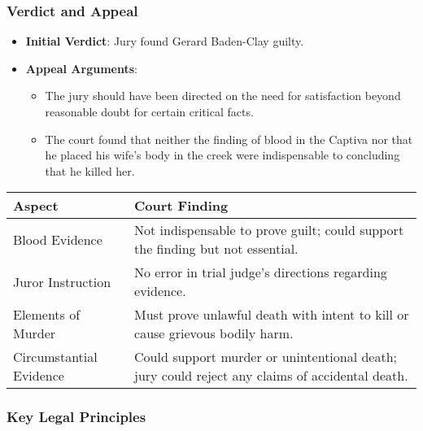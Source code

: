\subsubsection{Verdict and Appeal}\label{verdict-and-appeal}

\begin{itemize}
\tightlist
\item
  \textbf{Initial Verdict}: Jury found Gerard Baden-Clay guilty.
\item
  \textbf{Appeal Arguments}:

  \begin{itemize}
  \tightlist
  \item
    The jury should have been directed on the need for satisfaction
    beyond reasonable doubt for certain critical facts.
  \item
    The court found that neither the finding of blood in the Captiva nor
    that he placed his wife's body in the creek were indispensable to
    concluding that he killed her.
  \end{itemize}
\end{itemize}

\begin{longtable}[]{@{}
  >{\raggedright\arraybackslash}p{}
  >{\raggedright\arraybackslash}p{}@{}}
\toprule\noalign{}
\begin{minipage}[b]{\linewidth}\raggedright
Aspect
\end{minipage} & \begin{minipage}[b]{\linewidth}\raggedright
Court Finding
\end{minipage} \\
\midrule\noalign{}
\endhead
\bottomrule\noalign{}
\endlastfoot
Blood Evidence & Not indispensable to prove guilt; could support the
finding but not essential. \\
Juror Instruction & No error in trial judge's directions regarding
evidence. \\
Elements of Murder & Must prove unlawful death with intent to kill or
cause grievous bodily harm. \\
Circumstantial Evidence & Could support murder or unintentional death;
jury could reject any claims of accidental death. \\
\end{longtable}

\subsubsection{Key Legal Principles}\label{key-legal-principles}

